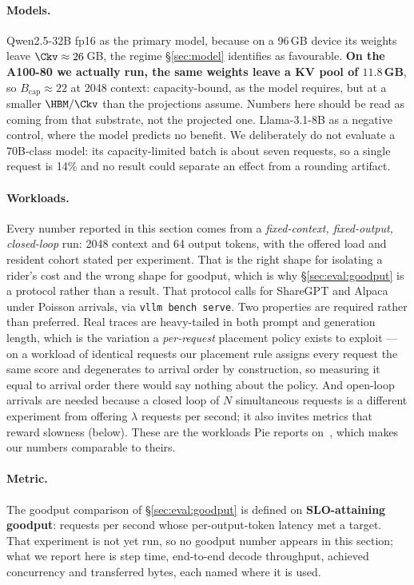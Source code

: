 \paragraph{Models.} Qwen2.5-32B fp16 as the primary model, because on a 96\,GB
device its weights leave $\Ckv \approx 26$\,GB, the regime \S\ref{sec:model}
identifies as favourable. \textbf{On the A100-80 we actually run, the same
weights leave a KV pool of $11.8$\,GB}, so $B_{\mathrm{cap}} \approx 22$ at 2048
context: capacity-bound, as the model requires, but at a smaller
$\HBM/\Ckv$ than the projections assume. Numbers here should be read as coming
from that substrate, not the projected one. Llama-3.1-8B
as a negative control, where the model predicts no benefit. We deliberately do
not evaluate a 70B-class model: its capacity-limited batch is about seven
requests, so a single request is 14\% and no result could separate an effect
from a rounding artifact.

\paragraph{Workloads.} Every number reported in this section comes from a
\emph{fixed-context, fixed-output, closed-loop} run: 2048 context and 64 output
tokens, with the offered load and resident cohort stated per experiment. That is
the right shape for isolating a rider's cost and the wrong shape for goodput,
which is why \S\ref{sec:eval:goodput} is a protocol rather than a result. That
protocol calls for ShareGPT and Alpaca under Poisson arrivals, via
\texttt{vllm bench serve}. Two properties are required rather than preferred.
Real traces are heavy-tailed in both prompt and generation length, which is the
variation a \emph{per-request} placement policy exists to exploit --- on a
workload of identical requests our placement rule assigns every request the
same score and degenerates to arrival order by construction, so measuring it
equal to arrival order there would say nothing about the policy. And open-loop
arrivals are needed because a closed loop of $N$ simultaneous requests is a
different experiment from offering $\lambda$ requests per second; it also
invites metrics that reward slowness (below). These are the workloads Pie
reports on~\cite{pie}, which makes our numbers comparable to theirs.

\paragraph{Metric.} The goodput comparison of \S\ref{sec:eval:goodput} is
defined on \textbf{SLO-attaining goodput}: requests per second whose
per-output-token latency met a target. That experiment is not yet run, so no
goodput number appears in this section; what we report here is step time,
end-to-end decode throughput, achieved concurrency and transferred bytes, each
named where it is used.

